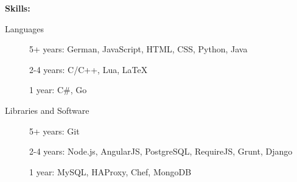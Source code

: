 \documentclass[11pt]{article}
\begin{document}
\bigskip
{\Large \textbf{Skills:}}
\hrulefill
\smallskip
\begin{description}
\item[Languages]
\hfill

5+ years: German, JavaScript, HTML, CSS, Python, Java

2-4 years: C/C++, Lua, LaTeX

1 year: C\#, Go
\item[Libraries and Software]
\hfill

5+ years: Git

2-4 years: Node.js, AngularJS, PostgreSQL, RequireJS, Grunt, Django

1 year: MySQL, HAProxy, Chef, MongoDB
\end{description}
\end{document}
